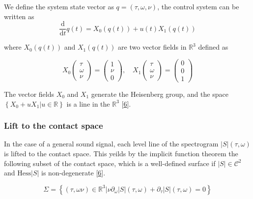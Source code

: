 \documentclass[american,]{article}
\theoremstyle{definition}
\theoremstyle{definition}
\theoremstyle{definition}
\theoremstyle{remark}
\begin{document}
We define the system state vector as \(q=(\tau,\omega,\nu)\), the control system
can be written as
\begin{equation}
\frac{\mathrm{d}}{\mathrm{d}t}q(t) = X_0(q(t)) + u(t) X_1(q(t))
\end{equation}

where \(X_0(q(t))\) and \(X_1(q(t))\) are two vector fields in \(\mathbb{R}^3\) defined as

\begin{equation}
X_0\begin{pmatrix}\tau\\\omega\\\nu\end{pmatrix} = \begin{pmatrix}1\\\nu\\0\end{pmatrix},\quad 
X_1\begin{pmatrix}\tau\\\omega\\\nu\end{pmatrix} = \begin{pmatrix}0\\0\\1\end{pmatrix}
\end{equation}

The vector fields \(X_0\) and \(X_1\) generate the Heisenberg group,
and the space \(\left\{X_0+uX_1\vert u\in\mathbb{R}\right\}\) is a line in the \(\mathbb{R}^3\) {[}\protect\hyperlink{ref-boscain2021}{6}{]}.

\hypertarget{lift-to-the-contact-space}{%
\subsubsection{Lift to the contact space}\label{lift-to-the-contact-space}}

In the case of a general sound signal, each level line of the spectrogram
\(\left\lvert S\right\rvert(\tau,\omega)\) is lifted to the contact space.
This yeilds by the implicit function theorem the following subset
of the contact space, which is a well-defined surface
if \(\left\lvert S\right\rvert\in\mathcal{C}^2\) and \(\mathrm{Hess}\left\lvert S\right\rvert\) is non-degenerate {[}\protect\hyperlink{ref-boscain2021}{6}{]}.

\begin{equation}
\Sigma = \left\{(\tau,\omega\nu)\in\mathbb{R}^3 \vert\nu\partial_\omega\left\lvert S\right\rvert(\tau,\omega) + \partial_\tau\left\lvert S\right\rvert(\tau,\omega) = 0\right\}
\end{equation}
\end{document}
